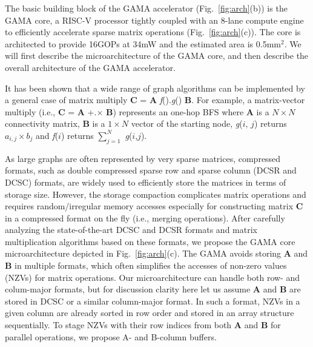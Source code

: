 \noindent
The basic building block of the GAMA accelerator (Fig.~\ref{fig:arch}(b)) is the GAMA core,
a RISC-V processor  tightly coupled with an 8-lane compute engine to efficiently accelerate sparse matrix operations (Fig.~\ref{fig:arch}(c)).
The core is architected to provide 16GOPs at 34mW and the estimated area is 0.5mm$^2$.
We will first describe the microarchitecture of the GAMA core, and then describe the overall architecture of the GAMA accelerator.


It has been shown that a wide range of graph algorithms can be implemented by a general case of matrix multiply \textbf{C} = \textbf{A} \textit{f}().\textit{g}() \textbf{B}. 
For example, a matrix-vector multiply (i.e., \textbf{C} = \textbf{A} +.$\times$ \textbf{B}) represents an one-hop BFS 
where \textbf{A} is a $N \times N$ connectivity matrix, \textbf{B} is a $1 \times N$ vector of the starting node, 
\textit{g}($i$, $j$) returns $a_{i,j} \times b_{j}$ and \textit{f}($i$) returns $\sum_{j=1}^{N}$ \textit{g}($i$,$j$).


As large graphs are often represented by very sparse matrices, compressed formats, such as double compressed sparse row and sparse column (DCSR  and DCSC) formats, are widely used to efficiently store the matrices in terms of storage size.
However, the storage compaction complicates matrix operations and requires random/irregular memory accesses especially for constructing matrix \textbf{C} in a compressed format on the fly (i.e., merging operations).
After carefully analyzing the state-of-the-art DCSC and DCSR formats and matrix multiplication algorithms based on these formats, 
we propose the GAMA core microarchitecture depicted in Fig.~\ref{fig:arch}(c). The GAMA avoids storing \textbf{A} and \textbf{B} in multiple formats, which often simplifies the accesses of  non-zero values (NZVs) for matrix operations.
Our microarchitecture can handle both row- and colum-major formats, but for discussion clarity here let us assume  \textbf{A} and \textbf{B} are stored in DCSC or a similar column-major format.
In such a format, NZVs in a given column are already sorted in row order and stored in an array structure sequentially. 
To stage NZVs with their row indices from both \textbf{A} and \textbf{B} for parallel operations, we propose A- and B-column buffers. 


